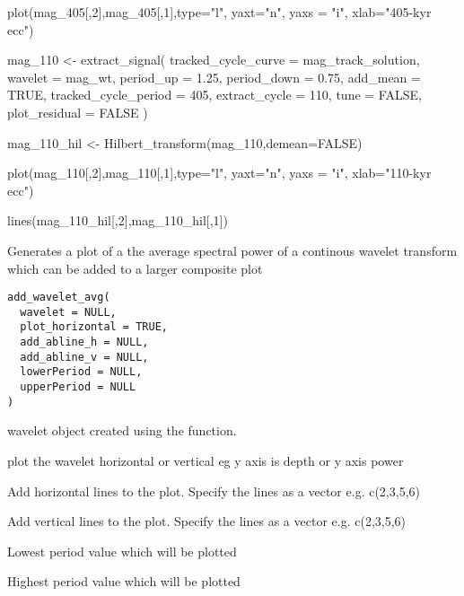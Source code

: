 \documentclass[a4paper]{book}
\begin{document}
\begin{Examples}
\begin{ExampleCode}
plot(mag_405[,2],mag_405[,1],type="l",
    yaxt="n", yaxs = "i",
    xlab="405-kyr ecc")


mag_110 <- extract_signal(
 tracked_cycle_curve = mag_track_solution,
 wavelet = mag_wt,
 period_up = 1.25,
 period_down = 0.75,
 add_mean = TRUE,
 tracked_cycle_period = 405,
 extract_cycle = 110,
 tune = FALSE,
 plot_residual = FALSE
)

mag_110_hil <- Hilbert_transform(mag_110,demean=FALSE)

plot(mag_110[,2],mag_110[,1],type="l",
    yaxt="n", yaxs = "i",
    xlab="110-kyr ecc")

lines(mag_110_hil[,2],mag_110_hil[,1])

\end{ExampleCode}
\end{Examples}
%
\begin{Description}
Generates a plot of a the average spectral power of a continous wavelet transform
which can be added to a larger composite plot
\end{Description}
%
\begin{Usage}
\begin{verbatim}
add_wavelet_avg(
  wavelet = NULL,
  plot_horizontal = TRUE,
  add_abline_h = NULL,
  add_abline_v = NULL,
  lowerPeriod = NULL,
  upperPeriod = NULL
)
\end{verbatim}
\end{Usage}
%
\begin{Arguments}
\begin{ldescription}
\item[\code{wavelet}] wavelet object created using the  function.

\item[\code{plot\_horizontal}] plot the wavelet horizontal or vertical eg y axis is depth or y axis power 

\item[\code{add\_abline\_h}] Add horizontal lines to the plot. Specify the lines as a vector e.g. c(2,3,5,6)  

\item[\code{add\_abline\_v}] Add vertical lines to the plot. Specify the lines as a vector e.g. c(2,3,5,6)  

\item[\code{lowerPeriod}] Lowest period value which will be plotted

\item[\code{upperPeriod}] Highest period value which will be plotted
\end{ldescription}
\end{Arguments}
\end{document}
